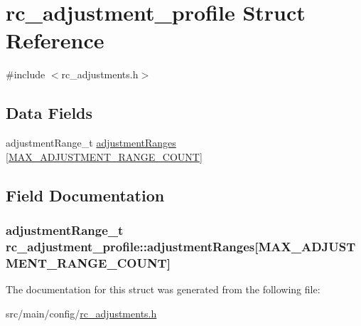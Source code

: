 \hypertarget{structrc__adjustment__profile}{\section{rc\+\_\+adjustment\+\_\+profile Struct Reference}
\label{structrc__adjustment__profile}
}


{\ttfamily \#include $<$rc\+\_\+adjustments.\+h$>$}

\subsection*{Data Fields}
\begin{DoxyCompactItemize}
\item 
adjustment\+Range\+\_\+t \hyperlink{structrc__adjustment__profile_a9ad6beb00238715bb56b6014d8673ebf}{adjustment\+Ranges} \mbox{[}\hyperlink{config_2rc__adjustments_8h_a8b154a1fcc1c63c047a7e6909dacfd97}{M\+A\+X\+\_\+\+A\+D\+J\+U\+S\+T\+M\+E\+N\+T\+\_\+\+R\+A\+N\+G\+E\+\_\+\+C\+O\+U\+N\+T}\mbox{]}
\end{DoxyCompactItemize}


\subsection{Field Documentation}
\hypertarget{structrc__adjustment__profile_a9ad6beb00238715bb56b6014d8673ebf}{
\subsubsection[{adjustment\+Ranges}]{\setlength{\rightskip}{0pt plus 5cm}adjustment\+Range\+\_\+t rc\+\_\+adjustment\+\_\+profile\+::adjustment\+Ranges\mbox{[}{\bf M\+A\+X\+\_\+\+A\+D\+J\+U\+S\+T\+M\+E\+N\+T\+\_\+\+R\+A\+N\+G\+E\+\_\+\+C\+O\+U\+N\+T}\mbox{]}}}\label{structrc__adjustment__profile_a9ad6beb00238715bb56b6014d8673ebf}


The documentation for this struct was generated from the following file\+:\begin{DoxyCompactItemize}
\item 
src/main/config/\hyperlink{config_2rc__adjustments_8h}{rc\+\_\+adjustments.\+h}\end{DoxyCompactItemize}
